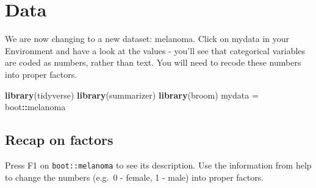 \documentclass[]{book}
\makeatletter
\newenvironment{Shaded}{\begin{snugshade}}{\end{snugshade}}
\newcommand{\KeywordTok}[1]{\textcolor[rgb]{0.13,0.29,0.53}{\textbf{#1}}}
\newcommand{\NormalTok}[1]{#1}
\newcommand{\OperatorTok}[1]{\textcolor[rgb]{0.81,0.36,0.00}{\textbf{#1}}}
\newcommand{\StringTok}[1]{\textcolor[rgb]{0.31,0.60,0.02}{#1}}
\newenvironment{kframe}{%
\medskip{}
\setlength{\fboxsep}{.8em}
 \def\at@end@of@kframe{}%
 \ifinner\ifhmode%
  \def\at@end@of@kframe{\end{minipage}}%
  \begin{minipage}{\columnwidth}%
 \fi\fi%
 \def\FrameCommand##1{\hskip\@totalleftmargin \hskip-\fboxsep
 \colorbox{shadecolor}{##1}\hskip-\fboxsep
     \hskip-\linewidth \hskip-\@totalleftmargin \hskip\columnwidth}%
 \MakeFramed {\advance\hsize-\width
   \@totalleftmargin\z@ \linewidth\hsize
   \@setminipage}}%
 {\par\unskip\endMakeFramed%
 \at@end@of@kframe}
\renewenvironment{Shaded}{\begin{kframe}}{\end{kframe}}
\theoremstyle{definition}
\theoremstyle{definition}
\theoremstyle{definition}
\theoremstyle{remark}
\makeatother
\begin{document}
\hypertarget{data-4}{%
\section{Data}\label{data-4}}

We are now changing to a new dataset: melanoma. Click on mydata in your
Environment and have a look at the values - you'll see that categorical
variables are coded as numbers, rather than text. You will need to
recode these numbers into proper factors.

\begin{Shaded}
\begin{Highlighting}[]
\KeywordTok{library}\NormalTok{(tidyverse)}
\KeywordTok{library}\NormalTok{(summarizer)}
\KeywordTok{library}\NormalTok{(broom)}
\NormalTok{mydata =}\StringTok{ }\NormalTok{boot}\OperatorTok{::}\NormalTok{melanoma}
\end{Highlighting}
\end{Shaded}

\hypertarget{recap-on-factors}{%
\subsection{Recap on factors}\label{recap-on-factors}}

Press F1 on \texttt{boot::melanoma} to see its description. Use the
information from help to change the numbers (e.g.~0 - female, 1 - male)
into proper factors.
\end{document}
